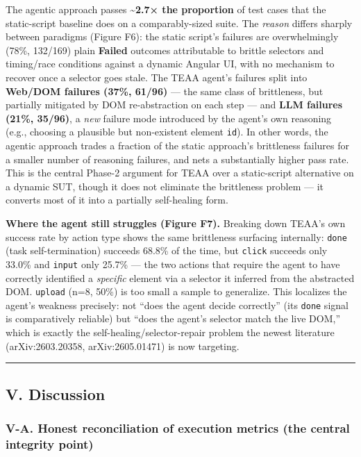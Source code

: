 \documentclass[
]{article}
\begin{document}
The agentic approach passes \textbf{\textasciitilde2.7× the proportion}
of test cases that the static-script baseline does on a comparably-sized
suite. The \emph{reason} differs sharply between paradigms (Figure F6):
the static script's failures are overwhelmingly (78\%, 132/169) plain
\textbf{Failed} outcomes attributable to brittle selectors and
timing/race conditions against a dynamic Angular UI, with no mechanism
to recover once a selector goes stale. The TEAA agent's failures split
into \textbf{Web/DOM failures (37\%, 61/96)} --- the same class of
brittleness, but partially mitigated by DOM re-abstraction on each step
--- and \textbf{LLM failures (21\%, 35/96)}, a \emph{new} failure mode
introduced by the agent's own reasoning (e.g., choosing a plausible but
non-existent element \texttt{id}). In other words, the agentic approach
trades a fraction of the static approach's brittleness failures for a
smaller number of reasoning failures, and nets a substantially higher
pass rate. This is the central Phase-2 argument for TEAA over a
static-script alternative on a dynamic SUT, though it does not eliminate
the brittleness problem --- it converts most of it into a partially
self-healing form.

\textbf{Where the agent still struggles (Figure F7).} Breaking down
TEAA's own success rate by action type shows the same brittleness
surfacing internally: \texttt{done} (task self-termination) succeeds
68.8\% of the time, but \texttt{click} succeeds only 33.0\% and
\texttt{input} only 25.7\% --- the two actions that require the agent to
have correctly identified a \emph{specific} element via a selector it
inferred from the abstracted DOM. \texttt{upload} (n=8, 50\%) is too
small a sample to generalize. This localizes the agent's weakness
precisely: not ``does the agent decide correctly'' (its \texttt{done}
signal is comparatively reliable) but ``does the agent's selector match
the live DOM,'' which is exactly the self-healing/selector-repair
problem the newest literature (arXiv:2603.20358, arXiv:2605.01471) is
now targeting.

\begin{center}\rule{0.5\linewidth}{0.5pt}\end{center}

\subsection{V. Discussion}\label{v.-discussion}

\subsubsection{V-A. Honest reconciliation of execution metrics (the
central integrity
point)}\label{v-a.-honest-reconciliation-of-execution-metrics-the-central-integrity-point}
\end{document}
